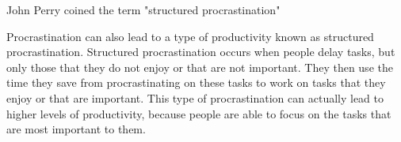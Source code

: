 

John Perry coined the term "structured procrastination"

Procrastination can also lead to a type of productivity known as structured procrastination.
Structured procrastination occurs when people delay tasks,
but only those that they do not enjoy or that are not important.
They then use the time they save from procrastinating on these tasks to work on tasks that they
enjoy or that are important. This type of procrastination can actually lead to higher levels of productivity,
because people are able to focus on the tasks that are most important to them.

